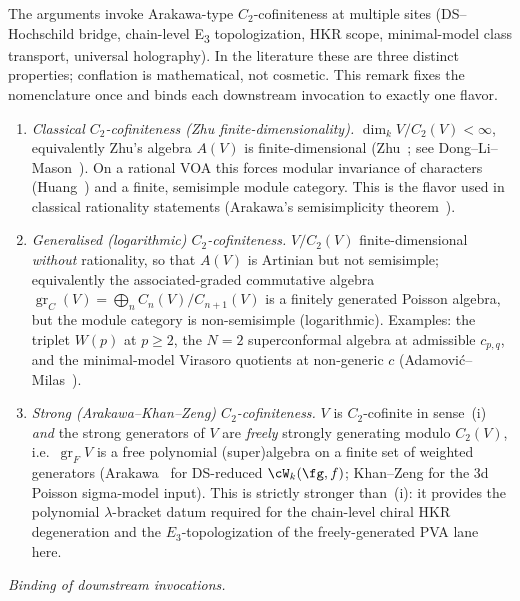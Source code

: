 \begin{remark}
\label{rem:c2-cofiniteness-flavors}
The arguments invoke Arakawa-type $C_2$-cofiniteness at multiple
sites (DS--Hochschild bridge, chain-level E\textsubscript{3}
topologization, HKR scope, minimal-model class transport, universal
holography). In the literature these are three distinct properties;
conflation is mathematical, not cosmetic. This remark fixes the
nomenclature once and binds each downstream invocation to exactly one
flavor.
\begin{enumerate}[label=\textup{(\roman*)}]
\item \emph{Classical $C_2$-cofiniteness (Zhu finite-dimensionality).}
$\dim_k V/C_2(V) < \infty$, equivalently Zhu's algebra $A(V)$ is
finite-dimensional (Zhu~\cite{Zhu96}; see
Dong--Li--Mason~\cite{DLM98}). On a rational VOA this forces
modular invariance of characters (Huang~\cite{Hua05}) and a
finite, semisimple module category. This is the flavor used in
classical rationality statements (Arakawa's semisimplicity
theorem~\cite{Arakawa15}).
\item \emph{Generalised (logarithmic) $C_2$-cofiniteness.}
$V/C_2(V)$ finite-dimensional \emph{without} rationality, so that
$A(V)$ is Artinian but not semisimple; equivalently the
associated-graded commutative algebra $\operatorname{gr}_C(V) =
\bigoplus_n C_n(V)/C_{n+1}(V)$ is a finitely generated Poisson
algebra, but the module category is non-semisimple (logarithmic).
Examples: the triplet $W(p)$ at $p\ge 2$, the $N{=}2$ superconformal
algebra at admissible $c_{p,q}$, and the minimal-model Virasoro
quotients at non-generic $c$
(Adamovi\'c--Milas~\cite{AdamovicMilas08}).
\item \emph{Strong (Arakawa--Khan--Zeng) $C_2$-cofiniteness.}
$V$ is $C_2$-cofinite in sense~(i) \emph{and} the strong generators
of $V$ are \emph{freely} strongly generating modulo $C_2(V)$, i.e.\
$\operatorname{gr}_F V$ is a free polynomial (super)algebra on a
finite set of weighted generators (Arakawa~\cite{Arakawa15}
for DS-reduced $\cW_k(\fg, f)$; Khan--Zeng for the $3$d Poisson
sigma-model input). This is strictly stronger than~(i): it
provides the polynomial $\lambda$-bracket datum required for the
chain-level chiral HKR degeneration and the $E_3$-topologization
of the freely-generated PVA lane here.
\end{enumerate}
\emph{Binding of downstream invocations.}
\begin{itemize}

\end{itemize}
\end{remark}
